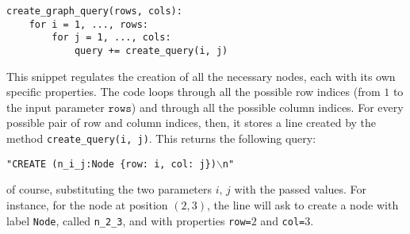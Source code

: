 \documentclass[conference]{IEEEtran}
\begin{document}
\begin{tcolorbox}[colback=yellow!5!white, colframe=yellow!50!black]
\begin{verbatim}
create_graph_query(rows, cols):
	for i = 1, ..., rows:
		for j = 1, ..., cols:
			query += create_query(i, j)
\end{verbatim}
\end{tcolorbox}

This snippet regulates the creation of all the necessary nodes, each with its own specific properties. The code loops through all the possible row indices (from $1$ to the input parameter $\texttt{rows}$) and through all the possible column indices. For every possible pair of row and column indices, then, it stores a line created by the method \texttt{create\_query(i, j)}. This returns the following query:
\begin{center}
	\texttt{"CREATE (n\_i\_j:Node \{row: i, col: j\})$\backslash$n"}
\end{center}
of course, substituting the two parameters $i,\,j$ with the passed values. For instance, for the node at position $(2, 3)$, the line will ask to create a node with label \texttt{Node}, called \texttt{n\_2\_3}, and with properties \texttt{row=}$2$ and \texttt{col=}$3$.
\end{document}
